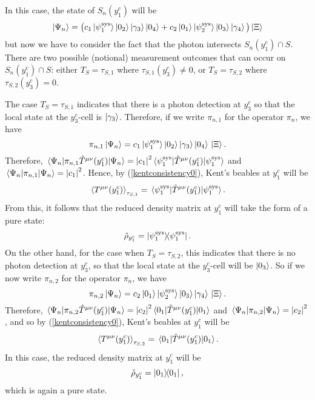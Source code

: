 In this case, the state of $S_n(y^c_1)$ will be
 \begin{equation*}
 \ket{\Psi_n}=\big(c_1\ket{\psi_1^\text{sys}}\ket{0_2}\ket{\gamma_3}\ket{0_4}+c_2\ket{0_1}\ket{\psi_2^\text{sys}}\ket{0_3}\ket{\gamma_4}\big)\ket*{\Xi}
 \end{equation*}
 but now we have to consider the fact that the photon intersects $S_n(y^c_1)\cap S$. There are two possible (notional) measurement outcomes that can occur on $S_n(y^c_1)\cap S$: either $T_S=\tau_{S,1}$ where $\tau_{S,1}(y^c_3)\neq 0$, or $T_S=\tau_{S,2}$ where $\tau_{S,2}(y^c_3)=0.$ 
 
 The case  $T_S=\tau_{S,1}$ indicates that there is a photon detection at $y^c_3$ so that the local state at the $y^c_3$-cell is $\ket{\gamma_3}$. Therefore, if we write $\pi_{n,1}$ for the operator $\pi_n$, we have 
 $$\pi_{n,1}\ket{\Psi_n}=c_1\ket{\psi_1^\text{sys}}\ket{0_2}\ket{\gamma_3}\ket{0_4}\ket*{\Xi}.$$
 Therefore, 
 $\ev*{\pi_{n,1}\hat{T}^{\mu\nu}(y^c_1)}{\Psi_n}=\abs{c_1}^2\ev*{\hat{T}^{\mu\nu}(y^c_1)}{\psi_1^\text{sys}}$ and  $\ev*{\pi_{n,1}}{\Psi_n}=\abs{c_1}^2$. Hence, by (\ref{kentconsistency0}), Kent's beables at $y^c_1$ will be 
 $$\ev*{T^{\mu\nu}(y^c_1)}_{\tau_{S,1}}=\ev*{\hat{T}^{\mu\nu}(y^c_1)}{\psi_1^\text{sys}}.$$ 
 From this, it follows that the reduced density matrix at $y^c_1$ will take the form of a pure state:
 \begin{equation}\label{purerho}
\hat{\rho}_{y^c_1}= \dyad{\psi_1^\text{sys}}.
\end{equation} 
 On the other hand, for the case when  $T_S=\tau_{S,2}$, this indicates that there is no photon detection at $y^c_3$, so that the local state at the $y^c_3$-cell will be $\ket{0_3}$. So if we now  write $\pi_{n,2}$ for the operator $\pi_n$, we have 
 $$\pi_{n,2}\ket{\Psi_n}=c_2\ket{0_1}\ket{\psi_2^\text{sys}}\ket{0_3}\ket{\gamma_4}\ket*{\Xi}.$$
 Therefore, 
 $\ev*{\pi_{n,2}\hat{T}^{\mu\nu}(y^c_1)}{\Psi_n}=\abs{c_2}^2\ev*{\hat{T}^{\mu\nu}(y^c_1)}{0_1}$ and  $\ev*{\pi_{n,2}}{\Psi_n}=\abs{c_2}^2$,  
  and so by (\ref{kentconsistency0}), Kent's beables at $y^c_1$ will be 
 $$\ev*{T^{\mu\nu}(y^c_1)}_{\tau_{S,2}}=\ev*{\hat{T}^{\mu\nu}(y^c_1)}{0_1}.$$
 In this case, the reduced density matrix at $y^c_1$  will be
  \begin{equation}
\hat{\rho}_{y^c_1}= \dyad{0_1},
\end{equation} 
which is again a pure state.

